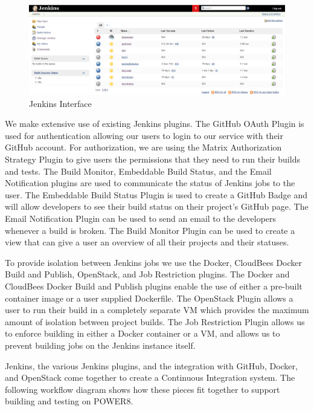 \documentclass[10pt,onecolumn,journal,draftclsnofoot]{IEEEtran}
\begin{document}
\begin{figure}[H] 
  \includegraphics[width=\textwidth]{images/jenkins.eps}
  \caption{Jenkins Interface}
\end{figure}
\clearpage
We make extensive use of existing Jenkins plugins.
The GitHub OAuth Plugin is used for authentication allowing our users to login to our service with their GitHub account.
For authorization, we are using the Matrix Authorization Strategy Plugin to give users the permissions that they need to run their builds and tests.
The Build Monitor, Embeddable Build Status, and the Email Notification plugins are used to communicate the status of Jenkins jobs to the user.
The Embeddable Build Status Plugin is used to create a GitHub Badge and will allow developers to see their build status on their project's GitHub page.
The Email Notification Plugin can be used to send an email to the developers whenever a build is broken.
The Build Monitor Plugin can be used to create a view that can give a user an overview of all their projects and their statuses.

To provide isolation between Jenkins jobs we use the Docker, CloudBees Docker Build and Publish, OpenStack, and Job Restriction plugins. 
The Docker and CloudBees Docker Build and Publish plugins enable the use of either a pre-built container image or a user supplied Dockerfile.
The OpenStack Plugin allows a user to run their build in a completely separate VM which provides the maximum amount of isolation between project builds. 
The Job Restriction Plugin allows us to enforce building in either a Docker container or a VM, and allows us to prevent building jobs on the Jenkins instance itself. 

Jenkins, the various Jenkins plugins, and the integration with GitHub, Docker, and OpenStack come together to create a Continuous Integration system.
The following workflow diagram shows how these pieces fit together to support building and testing on POWER8.
\end{document}
